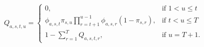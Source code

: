 \begin{equation}
  Q_{a, s, t, u} =
    \left\{
    \begin{array}{ll}
      0, 
      & 
      \text{if} \,\, 1 < u \leq t \\
      \phi_{a, s, t} 
      \pi_{s, u} 
      \prod_{r = t + 1}^{u - 1} 
        \phi_{a, s, r} \left(1 - \pi_{s, r} \right),
      & 
      \text{if} \,\, t < u \leq T \\
      1 - \sum_{r = 1}^{T} Q_{a, s, t, r},
      &
      \text{if} \,\, u = T+1.
    \end{array}\right.
  \label{eqn:multinomial-probabilities}
\end{equation}
  
